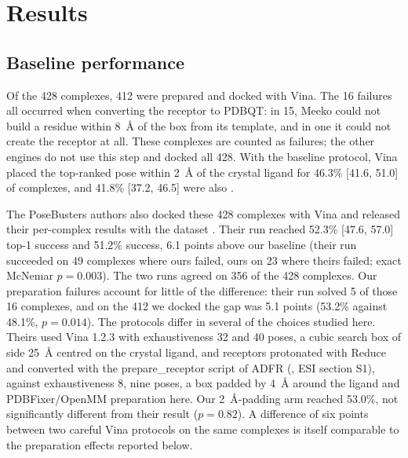\section{Results}
\label{sec:results}


\subsection{Baseline performance}

Of the 428 complexes, 412 were prepared and docked with Vina. The 16 failures all occurred
when converting the receptor to PDBQT: in 15, Meeko could not build a residue within
\SI{8}{\angstrom} of the box from its template, and in one it could not create the receptor
at all. These
complexes are counted as failures; the other engines do not use this step and docked all
428. With the baseline protocol, Vina placed the top-ranked pose within \SI{2}{\angstrom} of
the crystal ligand for 46.3\% [41.6, 51.0] of complexes, and 41.8\% [37.2, 46.5] were also
\pbvalid{}.

The PoseBusters authors also docked these 428 complexes with Vina and released their
per-complex results with the dataset \citep{posebusters2023data}. Their run reached 52.3\%
[47.6, 57.0] top-1 success and 51.2\% \pbvalid{} success, 6.1 points above our baseline
(their run succeeded on 49 complexes where ours failed, ours on 23 where theirs failed;
exact McNemar $p = 0.003$). The two runs agreed on 356 of the 428 complexes. Our
preparation failures account for little of the difference: their run solved 5 of those 16
complexes, and on the 412 we docked the gap was 5.1 points (53.2\% against 48.1\%,
$p = 0.014$). The protocols differ in several of the choices studied here. Theirs used Vina
1.2.3 with exhaustiveness 32 and 40 poses, a cubic search box of side \SI{25}{\angstrom}
centred on the crystal ligand, and receptors protonated with Reduce \citep{word1999reduce}
and converted with the prepare\_receptor script of ADFR \citep{ravindranath2015autodockfr}
(\citealp{buttenschoen2024posebusters}, ESI section S1), against exhaustiveness 8, nine
poses, a box
padded by \SI{4}{\angstrom} around the ligand and PDBFixer/OpenMM preparation here. Our
\SI{2}{\angstrom}-padding arm reached 53.0\%, not significantly different from their result
($p = 0.82$). A difference of six points between two careful Vina protocols on the same
complexes is itself comparable to the preparation effects reported below.

